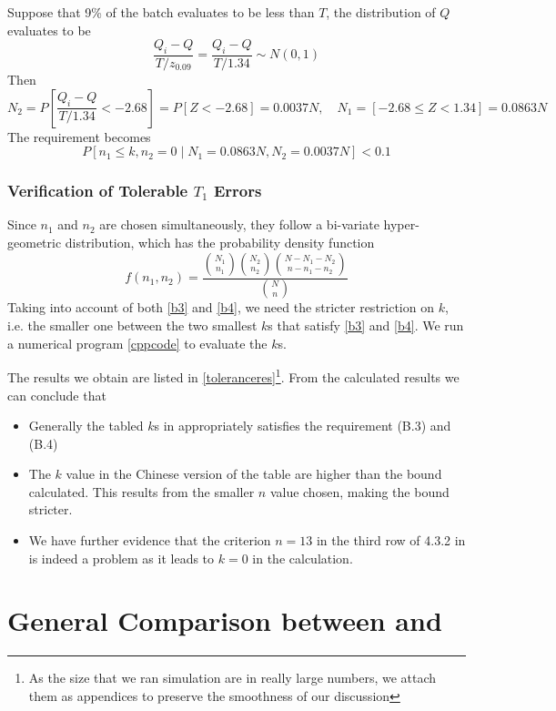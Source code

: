\documentclass[12pt]{article}
\begin{document}
Suppose that 9\% of the batch evaluates to be less than $T$, the distribution of $Q$ evaluates to be
$$
\dfrac{Q_i - Q}{T/z_{0.09}} = \dfrac{Q_i - Q}{T/1.34}\sim N(0,1)
$$
Then 
$$
N_2 = P[\dfrac{Q_i - Q}{T/1.34} < -2.68] = P[Z < -2.68] = 0.0037N, \quad N_1 = [-2.68\leq Z < 1.34] = 0.0863N
$$
The requirement becomes
\begin{equation}\label{b4}
    P[n_1\leq k, n_2 = 0\mid N_1 = 0.0863N, N_2 = 0.0037N] < 0.1
\end{equation}

\subsubsection{Verification of Tolerable $T_1$ Errors}

Since $n_1$ and $n_2$ are chosen simultaneously, they follow a bi-variate hyper-geometric distribution, which has the probability density function
$$
f(n_1, n_2) = \dfrac{\binom{N_1}{n_1}\binom{N_2}{n_2}\binom{N-N_1-N_2}{n-n_1-n_2}}{\binom{N}{n}}
$$
Taking into account of both \eqref{b3} and \eqref{b4}, we need the stricter restriction on $k$, i.e. the smaller one between the two smallest $k$s that satisfy \eqref{b3} and \eqref{b4}. We run a numerical program \ref{cppcode} to evaluate the $k$s. 

The results we obtain are listed in \ref{toleranceres}\footnote{As the size that we ran simulation are in really large numbers, we attach them as appendices to preserve the smoothness of our discussion}. From the calculated results we can conclude that

\begin{itemize}
    \item Generally the tabled $k$s in \cite{OIML2016} appropriately satisfies the requirement (B.3) and (B.4) 
    \item The $k$ value in the Chinese version of the table are higher than the bound calculated. This results from the smaller $n$ value chosen, making the bound stricter.
    \item We have further evidence that the criterion $n=13$ in the third row of 4.3.2 in \cite{JJF2005} is indeed a problem as it leads to $k = 0$ in the calculation.
\end{itemize}

\section{General Comparison between \cite{JJF2005} and \cite{OIML2016}}
\end{document}
